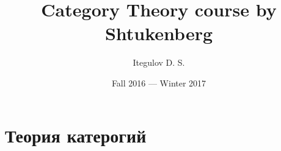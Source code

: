 \documentclass[a4paper, fleqn, draft]{report}
\author{Itegulov D. S.}
\title{Category Theory course by Shtukenberg}
\date{Fall 2016 --- Winter 2017}
\begin{document}
\maketitle
\tableofcontents
\newpage
\chapter{Теория катерогий}

\end{document}

